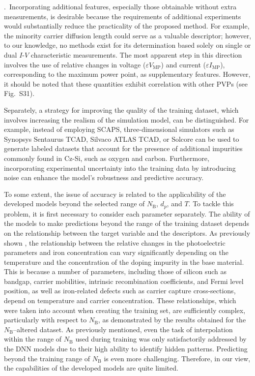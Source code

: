 \documentclass[a4paper,fleqn]{cas-sc}
\begin{document}
.~Incorporating additional features, especially those obtainable without extra measurements,
is desirable because the requirements of additional experiments would substantially reduce
the practicality of the proposed method.
For example, the minority carrier diffusion length could serve as a valuable descriptor;
however, to our knowledge, no methods exist for its determination based solely
on single or dual $I$-$V$ characteristic measurements.
The most apparent step in this direction involves the use
of relative changes in voltage ($\varepsilon V_\mathrm{MP}$) and current ($\varepsilon I_\mathrm{MP}$),
corresponding to the maximum power point, as supplementary features.
However, it should be noted that these quantities exhibit correlation with other PVPs (see Fig.~S31).

Separately, a strategy for improving the quality of the training dataset,
which involves increasing the realism of the simulation model, can be distinguished.
For example, instead of employing SCAPS, three-dimensional simulators such as Synopsys Sentaurus TCAD,
Silvaco ATLAS TCAD, or Solcore can be used to generate labeled datasets
that account for the presence of additional impurities commonly found in Cz-Si,
such as oxygen and carbon.
Furthermore, incorporating experimental uncertainty into the training data by introducing noise
can enhance the model’s robustness and predictive accuracy.

To some extent, the issue of accuracy is related to the applicability of the developed models beyond the selected range of  $N_\mathrm{B}$, $d_p$, and $T$.
To tackle this problem, it is first necessary to consider each parameter separately.
The ability of the models to make predictions beyond the range of the training dataset
depends on the relationship between the target variable and the descriptors.
As previously shown \cite{Olikh2025MSEB}, the relationship between the relative changes in the photoelectric parameters
and iron concentration can vary significantly depending on the temperature and the concentration of the doping impurity in the base material.
This is because a number of parameters, including those of silicon such as bandgap, carrier mobilities,
intrinsic recombination coefficients, and Fermi level position,
as well as iron-related defects such as carrier capture cross-sections, depend on temperature and carrier concentration.
These relationships, which were taken into account when creating the training set, are sufficiently complex,
particularly with respect to $N_\mathrm{B}$, as demonstrated by the results obtained for the $N_\mathrm{B}$--altered dataset.
As previously mentioned, even the task of interpolation within the range of $N_\mathrm{B}$ used during training
was only satisfactorily addressed by the DNN models due to their high ability to identify hidden patterns.
Predicting beyond the training range of $N_\mathrm{B}$ is even more challenging.
Therefore, in our view, the capabilities of the developed models are quite limited.
\end{document}
